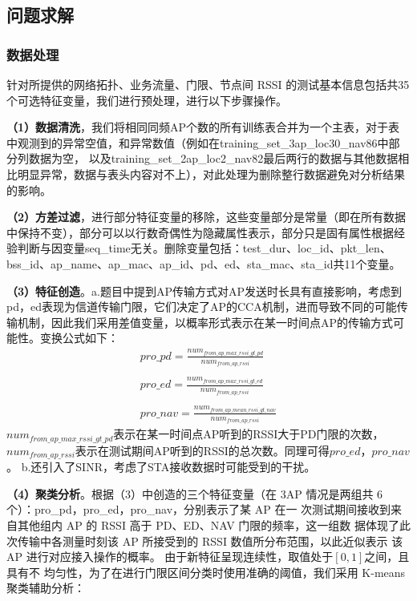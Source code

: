 \documentclass[bwprint]{gmcmthesis}
\begin{document}
\subsection{问题求解}
\subsubsection{数据处理}
针对所提供的网络拓扑、业务流量、门限、节点间 RSSI 的测试基本信息包括共35个可选特征变量，我们进行预处理，进行以下步骤操作。

\textbf{（1）数据清洗}，我们将相同同频AP个数的所有训练表合并为一个主表，对于表中观测到的异常空值，和异常数值（例如在training\_set\_3ap\_loc30\_nav86中部分列数据为空， 以及training\_set\_2ap\_loc2\_nav82最后两行的数据与其他数据相比明显异常，数据与表头内容对不上），对此处理为删除整行数据避免对分析结果的影响。

\textbf{（2）方差过滤}，进行部分特征变量的移除，这些变量部分是常量（即在所有数据中保持不变），部分可以以行数奇偶性为隐藏属性表示，部分只是固有属性根据经验判断与因变量seq\_time无关。删除变量包括：test\_dur、loc\_id、pkt\_len、bss\_id、ap\_name、ap\_mac、ap\_id、pd、ed、sta\_mac、sta\_id共11个变量。

\textbf{（3）特征创造}。a.题目中提到AP传输方式对AP发送时长具有直接影响，考虑到pd，ed表现为信道传输门限，它们决定了AP的CCA机制，进而导致不同的可能传输机制，因此我们采用差值变量，以概率形式表示在某一时间点AP的传输方式可能性。变换公式如下：
\begin{align}
    pro\_pd=\frac{num_{from\_ap\_max\_rssi\_gt\_pd}}{num_{from\_ap\_rssi}}\\
    \nonumber\\
    pro\_ed=\frac{num_{from\_ap\_max\_rssi\_gt\_ed}}{num_{from\_ap\_rssi}}\\
    \nonumber\\
    pro\_nav=\frac{num_{from\_ap\_mean\_rssi\_gt\_nav}}{num_{from\_ap\_rssi}}
    \end{align}
    $num_{from\_ap\_max\_rssi\_gt\_pd}$表示在某一时间点AP听到的RSSI大于PD门限的次数，$num_{from\_ap\_rssi}$表示在测试期间AP听到的RSSI的总次数。同理可得$pro\_ed$，$pro\_nav$。
b.还引入了SINR，考虑了STA接收数据时可能受到的干扰。

\textbf{（4）聚类分析}。根据（3）中创造的三个特征变量（在 3AP 情况是两组共 6 个）：pro\_pd，pro\_ed，pro\_nav，分别表示了某 AP 在一
次测试期间接收到来自其他组内 AP 的 RSSI 高于 PD、ED、NAV 门限的频率，这一组数
据体现了此次传输中各测量时刻该 AP 所接受到的 RSSI 数值所分布范围，以此近似表示
该 AP 进行对应接入操作的概率。
由于新特征呈现连续性，取值处于$[0,1]$之间，且具有不
均匀性，为了在进行门限区间分类时使用准确的阈值，我们采用 K-means 聚类辅助分析：
\end{document}
